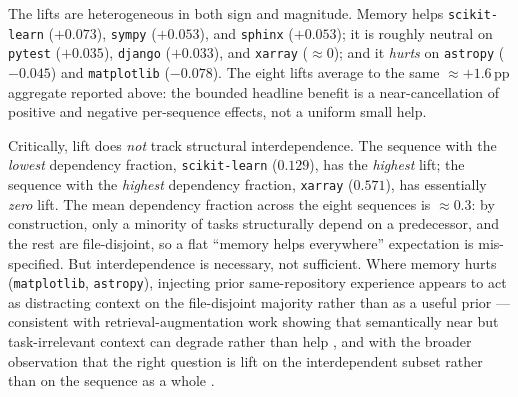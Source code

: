 The lifts are heterogeneous in both sign and magnitude. Memory helps \texttt{scikit-learn}
($+0.073$), \texttt{sympy} ($+0.053$), and \texttt{sphinx} ($+0.053$); it is roughly neutral
on \texttt{pytest} ($+0.035$), \texttt{django} ($+0.033$), and \texttt{xarray} ($\approx 0$);
and it \emph{hurts} on \texttt{astropy} ($-0.045$) and \texttt{matplotlib} ($-0.078$). The
eight lifts average to the same $\approx +1.6$\,pp aggregate reported above: the bounded
headline benefit is a near-cancellation of positive and negative per-sequence effects, not a
uniform small help.

Critically, lift does \emph{not} track structural interdependence. The sequence with the
\emph{lowest} dependency fraction, \texttt{scikit-learn} ($0.129$), has the \emph{highest}
lift; the sequence with the \emph{highest} dependency fraction, \texttt{xarray} ($0.571$),
has essentially \emph{zero} lift. The mean dependency fraction across the eight sequences is
$\approx 0.3$: by construction, only a minority of tasks structurally depend on a
predecessor, and the rest are file-disjoint, so a flat ``memory helps everywhere''
expectation is mis-specified. But interdependence is necessary, not sufficient. Where memory
hurts (\texttt{matplotlib}, \texttt{astropy}), injecting prior same-repository experience
appears to act as distracting context on the file-disjoint majority rather than as a useful
prior --- consistent with retrieval-augmentation work showing that semantically near but
task-irrelevant context can degrade rather than help \citep{liu2024,cuconasu2024}, and with
the broader observation that the right question is lift on the interdependent subset rather
than on the sequence as a whole \citep{xiong2025}.

